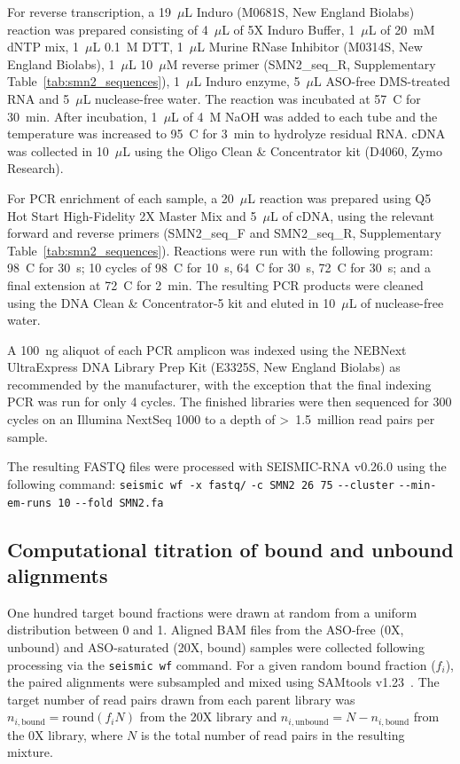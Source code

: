 \documentclass[unnumsec,webpdf,contemporary,large]{oup-authoring-template}%
\theoremstyle{thmstyleone}%
\theoremstyle{thmstyletwo}%
\theoremstyle{thmstylethree}%
\begin{document}
For reverse transcription, a 19~$\mu$L Induro (M0681S, New England Biolabs) reaction was prepared consisting of 4~$\mu$L of 5X Induro Buffer, 1~$\mu$L of 20~mM dNTP mix, 1~$\mu$L 0.1~M DTT, 1~$\mu$L Murine RNase Inhibitor (M0314S, New England Biolabs), 1~$\mu$L 10~$\mu$M reverse primer (SMN2\_seq\_R, Supplementary Table~\ref{tab:smn2_sequences}), 1~$\mu$L Induro enzyme, 5~$\mu$L ASO-free DMS-treated RNA and 5~$\mu$L nuclease-free water. The reaction was incubated at 57~\textdegree C for 30~min. After incubation, 1~$\mu$L of 4~M NaOH was added to each tube and the temperature was increased to 95~\textdegree C for 3~min to hydrolyze residual RNA. cDNA was collected in 10~$\mu$L using the Oligo Clean \& Concentrator kit (D4060, Zymo Research).

For PCR enrichment of each sample, a 20~$\mu$L reaction was prepared using Q5\textregistered{} Hot Start High-Fidelity 2X Master Mix and 5~$\mu$L of cDNA, using the relevant forward and reverse primers (SMN2\_seq\_F and SMN2\_seq\_R, Supplementary Table~\ref{tab:smn2_sequences}). Reactions were run with the following program: 98~\textdegree C for 30~s; 10 cycles of 98~\textdegree C for 10~s, 64~\textdegree C for 30~s, 72~\textdegree C for 30~s; and a final extension at 72~\textdegree C for 2~min. The resulting PCR products were cleaned using the DNA Clean \& Concentrator-5 kit and eluted in 10~$\mu$L of nuclease-free water.

A 100~ng aliquot of each PCR amplicon was indexed using the NEBNext UltraExpress\textregistered{} DNA Library Prep Kit (E3325S, New England Biolabs) as recommended by the manufacturer, with the exception that the final indexing PCR was run for only 4 cycles. The finished libraries were then sequenced for 300 cycles on an Illumina NextSeq 1000 to a depth of \textgreater~1.5~million read pairs per sample.

The resulting FASTQ files were processed with SEISMIC-RNA v0.26.0 using the following command: 
\verb|seismic wf -x fastq/| \verb|-c SMN2 26 75| \verb|--cluster| \verb|--min-em-runs 10| \verb|--fold SMN2.fa|

\subsection{Computational titration of bound and unbound alignments}

One hundred target bound fractions were drawn at random from a uniform distribution between 0 and 1. Aligned BAM files from the ASO-free (0X, unbound) and ASO-saturated (20X, bound) samples were collected following processing via the \verb|seismic wf| command. For a given random bound fraction ($f_i$), the paired alignments were subsampled and mixed using SAMtools v1.23~\cite{Li2009}. The target number of read pairs drawn from each parent library was $n_{i,\mathrm{bound}} = \mathrm{round}(f_i N)$ from the 20X library and $n_{i,\mathrm{unbound}} = N - n_{i,\mathrm{bound}}$ from the 0X library, where $N$ is the total number of read pairs in the resulting mixture.
\end{document}
